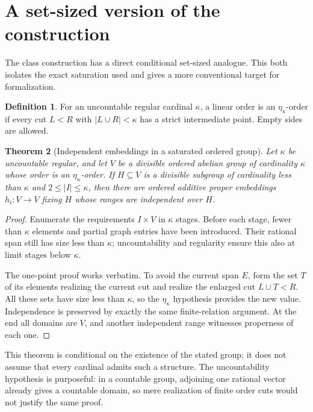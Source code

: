 \documentclass[11pt,letterpaper]{article}
\newtheorem{theorem}{Theorem}[section]
\theoremstyle{definition}
\newtheorem{definition}[theorem]{Definition}
\theoremstyle{remark}
\numberwithin{equation}{section}
\begin{document}
\section{A set-sized version of the construction}\label{isc:sec:setversion}

The class construction has a direct conditional set-sized analogue. This
both isolates the exact saturation used and gives a more conventional target
for formalization.

\begin{definition}
For an uncountable regular cardinal $\kappa$, a linear order is an
$\eta_\kappa$-order if every cut $L<R$ with
$|L\cup R|<\kappa$ has a strict intermediate point. Empty sides are
allowed.
\end{definition}

\begin{theorem}[Independent embeddings in a saturated ordered group]
\label{isc:thm:setversion}
Let $\kappa$ be uncountable regular, and let $V$ be a divisible ordered
abelian group of cardinality $\kappa$ whose order is an $\eta_\kappa$-order.
If $H\subseteq V$ is a divisible subgroup of cardinality less than
$\kappa$ and $2\le|I|\le\kappa$, then there are ordered additive proper
embeddings $h_i:V\to V$ fixing $H$ whose ranges are independent over $H$.
\end{theorem}
\begin{proof}
Enumerate the requirements $I\times V$ in $\kappa$ stages. Before each
stage, fewer than $\kappa$ elements and partial graph entries have been
introduced. Their rational span still has size less than $\kappa$;
uncountability and regularity ensure this also at limit stages below
$\kappa$.

The one-point proof works verbatim. To avoid the current span $E$, form the
set $T$ of its elements realizing the current cut and realize the enlarged
cut $L\cup T<R$. All these sets have size less than $\kappa$, so the
$\eta_\kappa$ hypothesis provides the new value. Independence is preserved
by exactly the same finite-relation argument. At the end all domains are
$V$, and another independent range witnesses properness of each one.
\end{proof}

This theorem is conditional on the existence of the stated group; it does
not assume that every cardinal admits such a structure. The uncountability
hypothesis is purposeful: in a countable group, adjoining one rational
vector already gives a countable domain, so mere realization of finite
order cuts would not justify the same proof.
\end{document}
